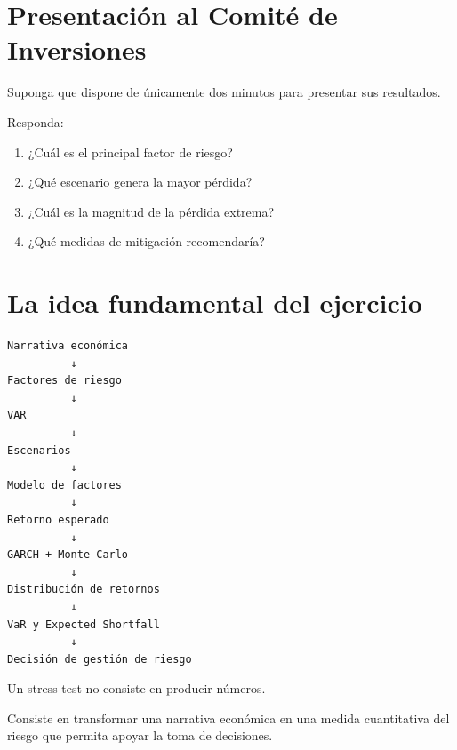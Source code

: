 \documentclass[11pt]{article}
\begin{document}
\section{Presentación al Comité de Inversiones}

Suponga que dispone de únicamente dos minutos para presentar sus resultados.

Responda:

\begin{enumerate}
\item ¿Cuál es el principal factor de riesgo?
\item ¿Qué escenario genera la mayor pérdida?
\item ¿Cuál es la magnitud de la pérdida extrema?
\item ¿Qué medidas de mitigación recomendaría?
\end{enumerate}

\section{La idea fundamental del ejercicio}

\begin{center}
\begin{verbatim}
Narrativa económica
          ↓
Factores de riesgo
          ↓
VAR
          ↓
Escenarios
          ↓
Modelo de factores
          ↓
Retorno esperado
          ↓
GARCH + Monte Carlo
          ↓
Distribución de retornos
          ↓
VaR y Expected Shortfall
          ↓
Decisión de gestión de riesgo
\end{verbatim}
\end{center}

\begin{tcolorbox}[colback=green!5,colframe=green!50!black,title=Mensaje Final]
Un stress test no consiste en producir números.

Consiste en transformar una narrativa económica en una medida cuantitativa del riesgo que permita apoyar la toma de decisiones.
\end{tcolorbox}
\end{document}
